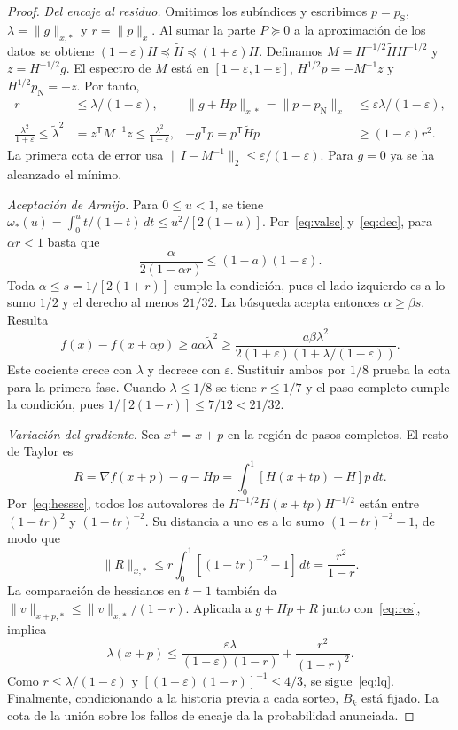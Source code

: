 \documentclass[11pt,a4paper]{article}
\newcommand{\T}{^{\mathsf T}}
\newcommand{\eps}{\varepsilon}
\newcommand{\nrm}[1]{\lVert #1\rVert}
\newcommand{\pN}{p_{\mathrm N}}
\newcommand{\pS}{p_{\mathrm S}}
\newcommand{\HS}{\widetilde H}
\newcommand{\lS}{\widetilde\lambda}
\begin{document}
\begin{proof}
\textit{Del encaje al residuo.}
Omitimos los subíndices y escribimos $p=\pS$, $\lambda=\nrm g_{x,*}$ y $r=\nrm p_x$. Al sumar la parte $P\succeq0$ a la aproximación de los datos se obtiene $(1-\eps)H\preceq\HS\preceq(1+\eps)H$. Definamos $M=H^{-1/2}\HS H^{-1/2}$ y $z=H^{-1/2}g$. El espectro de $M$ está en $[1-\eps,1+\eps]$, $H^{1/2}p=-M^{-1}z$ y $H^{1/2}\pN=-z$. Por tanto,
\begin{align}
 r&\le\lambda/(1-\eps), &
 \nrm{g+Hp}_{x,*}=\nrm{p-\pN}_x&\le\eps\lambda/(1-\eps),\label{eq:res}\\
 \frac{\lambda^2}{1+\eps}\le\lS^2&=z\T M^{-1}z\le\frac{\lambda^2}{1-\eps},&
 -g\T p=p\T\HS p&\ge(1-\eps)r^2 .\label{eq:dec}
\end{align}
La primera cota de error usa $\nrm{I-M^{-1}}_2\le\eps/(1-\eps)$. Para $g=0$ ya se ha alcanzado el mínimo.

\textit{Aceptación de Armijo.}
Para $0\le u<1$, se tiene $\omega_*(u)=\int_0^u t/(1-t)\,dt\le u^2/[2(1-u)]$. Por~\eqref{eq:valsc} y~\eqref{eq:dec}, para $\alpha r<1$ basta que
\[
 \frac{\alpha}{2(1-\alpha r)}\le(1-a)(1-\eps).
\]
Toda $\alpha\le s=1/[2(1+r)]$ cumple la condición, pues el lado izquierdo es a lo sumo $1/2$ y el derecho al menos $21/32$. La búsqueda acepta entonces $\alpha\ge\beta s$. Resulta
\[
 f(x)-f(x+\alpha p)\ge a\alpha\lS^2
 \ge\frac{a\beta\lambda^2}{2(1+\eps)(1+\lambda/(1-\eps))}.
\]
Este cociente crece con $\lambda$ y decrece con $\eps$. Sustituir ambos por $1/8$ prueba la cota para la primera fase. Cuando $\lambda\le1/8$ se tiene $r\le1/7$ y el paso completo cumple la condición, pues $1/[2(1-r)]\le7/12<21/32$.

\textit{Variación del gradiente.}
Sea $x^+=x+p$ en la región de pasos completos. El resto de Taylor es
\[
 R=\nabla f(x+p)-g-Hp=\int_0^1[H(x+tp)-H]p\,dt.
\]
Por~\eqref{eq:hesssc}, todos los autovalores de $H^{-1/2}H(x+tp)H^{-1/2}$ están entre $(1-tr)^2$ y $(1-tr)^{-2}$. Su distancia a uno es a lo sumo $(1-tr)^{-2}-1$, de modo que
\[
 \nrm R_{x,*}\le r\int_0^1 [(1-tr)^{-2}-1]\,dt=\frac{r^2}{1-r}.
\]
La comparación de hessianos en $t=1$ también da $\nrm v_{x+p,*}\le\nrm v_{x,*}/(1-r)$. Aplicada a $g+Hp+R$ junto con~\eqref{eq:res}, implica
\[
 \lambda(x+p)\le\frac{\eps\lambda}{(1-\eps)(1-r)}
                       +\frac{r^2}{(1-r)^2}.
\]
Como $r\le\lambda/(1-\eps)$ y $[(1-\eps)(1-r)]^{-1}\le4/3$, se sigue~\eqref{eq:lq}. Finalmente, condicionando a la historia previa a cada sorteo, $B_k$ está fijado. La cota de la unión sobre los fallos de encaje da la probabilidad anunciada.
\end{proof}
\end{document}
